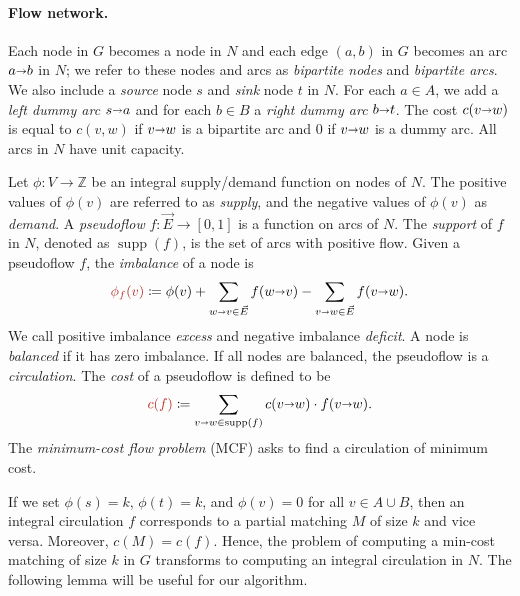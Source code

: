\documentclass[11pt]{article}
\def\ints{\mathbb{Z}}
\def\Set#1{\left\{ #1 \right\}}
\def\fsupply{\phi}
\def\arcto{\mathord\shortrightarrow}
\def\arc#1#2{#1\arcto#2}
\def\cost{c}
\def\supp{\operatorname{supp}}
\theoremstyle{plain}
\numberwithin{figure}{section}
\def\EMPH#1{\textcolor{BrickRed}{{\emph{#1}}}}
\begin{document}
\paragraph*{Flow network.}
Each node in $G$ becomes a node in $N$ and each edge
$(a, b)$ in $G$ becomes an arc $\arc{a}{b}$ in $N$;
we refer to these nodes and arcs as \EMPH{bipartite nodes} and \EMPH{bipartite arcs}.
We also include a \EMPH{source} node $s$ and \EMPH{sink} node $t$ in $N$.
For each $a \in A$, we add a \EMPH{left dummy arc} $\arc{s}{a}$ and for each
$b \in B$ a \EMPH{right dummy arc} $\arc{b}{t}$.
The cost \EMPH{$c(\arc{v}{w})$}
is equal to $c(v, w)$ if
$\arc{v}{w}$ is a bipartite arc and $0$ if $\arc{v}{w}$ is a dummy arc.
All arcs in $N$ have unit capacity.

Let $\fsupply: V \to \ints$ be an integral supply/demand function on nodes of $N$.
The positive values of $\fsupply(v)$ are referred to as \EMPH{supply}, and the
negative values of $\fsupply(v)$ as \EMPH{demand}.
A \EMPH{pseudoflow} $f: \vec{E} \to [0, 1]$ is a function on arcs of $N$.
The \EMPH{support} of $f$ in $N$, denoted as \EMPH{$\supp(f)$}, is the set of arcs with positive flow.
Given a pseudoflow $f$, the \EMPH{imbalance} of a node is
\[
\EMPH{$\fsupply_f (v)$} \coloneqq \fsupply(v) + \sum_{\arc wv \in \vec{E}}{f(\arc wv)} - \sum_{\arc vw \in \vec{E}}{f(\arc vw)}.
\]
We call positive imbalance \EMPH{excess} and negative imbalance \EMPH{deficit}.
A node is \EMPH{balanced} if it has zero imbalance.
If all nodes are balanced, the pseudoflow is a \EMPH{circulation}.
The \EMPH{cost} of a pseudoflow is defined to be
\[
 \EMPH{$\cost(f)$} \coloneqq \sum_{\arc vw \in \supp(f)} c(\arc vw) \cdot f(\arc vw).
\]
The \EMPH{minimum-cost flow problem} (MCF) asks to find a circulation of minimum cost.

If we set $\fsupply(s) = k$, $\fsupply(t) = k$, and $\fsupply(v) = 0$ for all
$v \in A \cup B$, then an integral circulation $f$ corresponds to a partial
matching $M$ of size $k$ and vice versa.
Moreover, $\cost(M) = \cost(f)$.
%
Hence, the problem of computing a min-cost matching of size $k$ in $G$
transforms to computing an integral circulation in $N$.
The following lemma will be useful for our algorithm.
\end{document}
